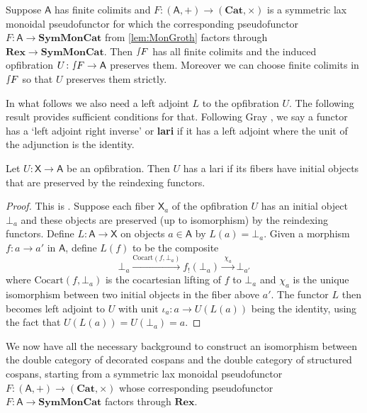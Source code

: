 \documentclass[ a4paper, onecolumn, superscriptaddress,10pt, accepted=2022-02-14, issue=3, volume=4, shorttitle=papers/compositionality-4-3 ]{compositionalityarticle}
\let\maps\colon
\newcommand{\A}{\mathsf{A}}
\newcommand{\X}{\mathsf{X}}
\newcommand{\bicat}{\mathbf}
\newcommand{\Cat}{\bicat{Cat}}
\newcommand{\Rex}{\bicat{Rex}}
\newcommand{\SMC}{\bicat{SymMonCat}}
\newcommand{\define}[1]{{\rm \textbf{#1}}}
\newcommand{\inta}{\raisebox{.3\depth}{$\smallint\hspace{-.01in}$}}
\begin{document}
\begin{cor} \label{cor:fcocMonGroth}
 Suppose $\A$ has finite colimits and $F \maps (\A,+) \to (\Cat,\times)$ is a symmetric lax monoidal pseudofunctor for which the corresponding
pseudofunctor $F  \maps \A \to \SMC$ from \cref{lem:MonGroth} factors through $\Rex\to\SMC$.  Then $\inta F$ has all finite colimits and  the induced
opfibration $U\maps \inta F \to \A$ preserves them.  Moreover we can choose finite colimits in $\inta F$ so that $U$ preserves them strictly.
\end{cor}

In what follows we also need a left adjoint $L$ to the opfibration $U$.  The following result provides sufficient conditions for that.  Following Gray \cite{Gray}, we say a functor has a `left adjoint right inverse' or \define{lari} if it has a left adjoint where the unit of the adjunction is the identity.

\begin{lem} \label{prop:opfibtolari}
Let $U \maps\X \to \A$ be an opfibration.   Then $U$ has a lari if its fibers have initial objects
that are preserved by the reindexing functors.
\end{lem}

\begin{proof}
 This is \cite[Proposition~4.4]{Gray}.    Suppose each fiber $\X_a$ of the opfibration $U$ has an initial object $\bot_a$ and these objects are preserved (up to isomorphism) by the reindexing functors.   Define $L \maps \A \to \X$ on objects $a \in \A$ by $L(a) = \bot_a$.   Given a morphism $f\maps a\to a'$ in $\A$, define $L(f)$ to be the composite
\[
  \bot_a\xrightarrow{\mathrm{Cocart}(f,\bot_a)}f_!(\bot_a)\xrightarrow{\;\chi_a\;}\bot_{a'}
\]
where $\mathrm{Cocart}(f,\bot_a)$ is the cocartesian lifting of $f$ to $\bot_a$ and $\chi_a$ is the unique isomorphism between two initial objects in
the fiber above $a'$.    The functor $L$ then becomes left adjoint to $U$ with unit $\iota_a \maps a \to U(L(a))$ being the identity, using the fact
that $U(L(a)) = U(\bot_a) = a$.
\end{proof}

We now have all the necessary background to construct an isomorphism between the double category of decorated cospans and the double category of structured cospans, starting from a symmetric lax monoidal pseudofunctor $F \maps (\A, +) \to (\Cat, \times)$ whose corresponding pseudofunctor $ F\maps \A \to \SMC$ factors through $\Rex$.
\end{document}
